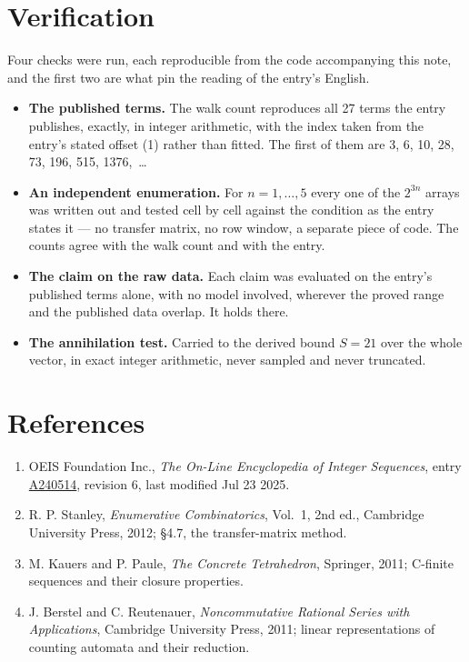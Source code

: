 \documentclass[11pt]{article}
\theoremstyle{definition}
\begin{document}
\section{Verification}

Four checks were run, each reproducible from the code accompanying this note, and the first two are what pin the reading of the entry's English.

\begin{itemize}

\item {\bfseries The published terms.} The walk count reproduces all 27 terms the entry publishes, exactly, in integer arithmetic, with the index taken from the entry's stated offset (1) rather than fitted. The first of them are 3, 6, 10, 28, 73, 196, 515, 1376,~\dots

\item {\bfseries An independent enumeration.} For $n = 1,\dots,5$ every one of the $2^{3n}$ arrays was written out and tested cell by cell against the condition as the entry states it --- no transfer matrix, no row window, a separate piece of code. The counts agree with the walk count and with the entry.

\item {\bfseries The claim on the raw data.} Each claim was evaluated on the entry's published terms alone, with no model involved, wherever the proved range and the published data overlap. It holds there.

\item {\bfseries The annihilation test.} Carried to the derived bound $S = 21$ over the whole vector, in exact integer arithmetic, never sampled and never truncated.

\end{itemize}

\section{References}

\begin{enumerate}

\item OEIS Foundation Inc., \emph{The On-Line Encyclopedia of Integer Sequences}, entry \href{https://oeis.org/A240514}{A240514}, revision 6, last modified Jul 23 2025.

\item R. P. Stanley, \emph{Enumerative Combinatorics}, Vol.~1, 2nd ed., Cambridge University Press, 2012; \S4.7, the transfer-matrix method.

\item M. Kauers and P. Paule, \emph{The Concrete Tetrahedron}, Springer, 2011; C-finite sequences and their closure properties.

\item J. Berstel and C. Reutenauer, \emph{Noncommutative Rational Series with Applications}, Cambridge University Press, 2011; linear representations of counting automata and their reduction.

\end{enumerate}
\end{document}
